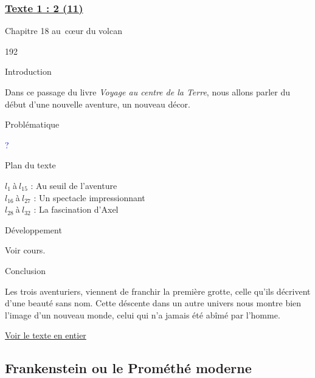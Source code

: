 \documentclass[12pt,a4paper]{article}
\begin{document}
				\subsubsection[Texte 2 (11)]{\textbf{\underline{Texte 1 : 2 (11)}}}
		Chapitre 18 au~c\oe ur du volcan
\begin{dingautolist}{192}

\item Introduction \par
Dans ce passage du livre \textit{Voyage au centre de la Terre}, nous allons parler du début d'une nouvelle aventure, un nouveau décor. 


\item Probl\'ematique \par
	\textcolor{blue}{?}
\item Plan du texte \par
	$l_{1}~$\`a$~l_{15}$ : Au seuil de l'aventure\\
    $l_{16}~$\`a$~l_{27}$ : Un spectacle impressionnant\\
    $l_{28}~$\`a$~l_{32}$ : La fascination d'Axel

\item D\'eveloppement \par
        Voir cours.

\item Conclusion \par
Les trois aventuriers, viennent de franchir la première grotte, celle qu'ils décrivent d'une beauté sans nom. Cette déscente dans un autre univers nous montre bien l'image d'un nouveau monde, celui qui n'a jamais été abîmé par l'homme. 

\end{dingautolist}
\href{.extra/Textes/Chapitre_18_Jules_Vernes.pdf}{Voir le texte en entier}

\newpage
\subsection{Frankenstein ou le Prom\'eth\'e moderne}
\end{document}
